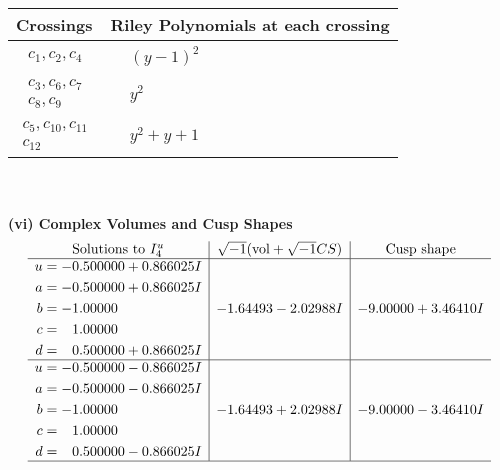 \documentclass[1p]{elsarticle_modified}
\theoremstyle{definition}
\newcommand{\I}{\sqrt{-1}}
\begin{document}
\begin{tabular}{m{50pt}|m{274pt}}
Crossings & \hspace{64pt}Riley Polynomials at each crossing \\
\hline $$\begin{aligned}c_{1},c_{2},c_{4}\end{aligned}$$&$\begin{aligned}
&(y-1)^2
\end{aligned}$\\
\hline $$\begin{aligned}c_{3},c_{6},c_{7}\\c_{8},c_{9}\end{aligned}$$&$\begin{aligned}
&y^2
\end{aligned}$\\
\hline $$\begin{aligned}c_{5},c_{10},c_{11}\\c_{12}\end{aligned}$$&$\begin{aligned}
&y^2+y+1
\end{aligned}$\\
\hline
\end{tabular}\\~\\
\newpage\flushleft \textbf{(vi) Complex Volumes and Cusp Shapes}
$$\begin{array}{c|c|c}  
\text{Solutions to }I^u_{4}& \I (\text{vol} + \sqrt{-1}CS) & \text{Cusp shape}\\
 \hline 
\begin{aligned}
u &= -0.500000 + 0.866025 I \\
a &= -0.500000 + 0.866025 I \\
b &= -1.00000\phantom{ +0.000000I} \\
c &= \phantom{-}1.00000\phantom{ +0.000000I} \\
d &= \phantom{-}0.500000 + 0.866025 I\end{aligned}
 & -1.64493 - 2.02988 I & -9.00000 + 3.46410 I \\ \hline\begin{aligned}
u &= -0.500000 - 0.866025 I \\
a &= -0.500000 - 0.866025 I \\
b &= -1.00000\phantom{ +0.000000I} \\
c &= \phantom{-}1.00000\phantom{ +0.000000I} \\
d &= \phantom{-}0.500000 - 0.866025 I\end{aligned}
 & -1.64493 + 2.02988 I & -9.00000 - 3.46410 I\\
 \hline 
 \end{array}$$\newpage\newpage\renewcommand{\arraystretch}{1}
\end{document}
